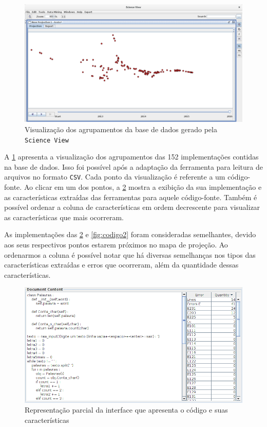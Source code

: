 	
		\begin{figure}[h]
			\centering
			\includegraphics[width=1\linewidth]{imagem/projecaoFinal} %
			\caption[Visualização dos agrupamentos da base de dados gerado pela \texttt{Science View}]
			{Visualização dos agrupamentos da base de dados gerado pela \texttt{Science View} \cite{Alencar-etal:2012}}
			\label{fig:projecaoFinal}
		\end{figure}
		
		A \cref{fig:projecaoFinal} apresenta a visualização dos agrupamentos das 152
		implementações contidas na base de dados. Isso foi possível após a adaptação da
		ferramenta para leitura de arquivos no formato \texttt{CSV}. Cada ponto da
		visualização é referente a um código-fonte. Ao clicar em um dos pontos, a
		\cref{fig:codigo1} mostra a exibição da sua implementação e
		as características extraídas das ferramentas para aquele código-fonte. Também
		é possível ordenar a coluna de características  em ordem
		decrescente para visualizar as características que mais ocorreram.
		
		As implementações das \cref{fig:codigo1} e \cref{fig:codigo2} foram consideradas
		semelhantes, devido aos seus respectivos pontos estarem próximos no mapa de
		projeção. Ao ordenarmos a coluna  é possível notar que há
		diversas semelhanças nos tipos das características extraídas e erros que
		ocorreram, além da quantidade dessas características.
		
		\begin{figure}[h]
			\centering
			\includegraphics[width=0.8\linewidth]{imagem/codigo1}
			\caption[Representação parcial da interface que apresenta o código e suas características]
			{Representação parcial da interface que apresenta o código e suas características \cite{Alencar-etal:2012}}
			\label{fig:codigo1}
		\end{figure}
		
